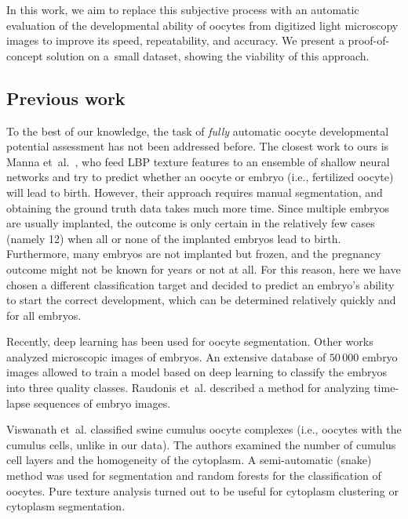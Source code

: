 \documentclass[]{spie}  %
\begin{document}
In this work, we aim to replace this subjective process with an automatic
evaluation of the developmental ability of oocytes from digitized light
microscopy images to improve its speed, repeatability, and accuracy. We present
a proof-of-concept solution on a~small dataset, showing the viability of this
approach.

\subsection{Previous work}

To the best of our knowledge, the task of \emph{fully} automatic oocyte developmental
potential assessment has not been addressed before. The closest work to ours is
Manna et~al.~\cite{manna2013}, who feed LBP texture features to an ensemble of
shallow neural networks and try to predict whether an oocyte or embryo (i.e.,
fertilized oocyte) will lead to birth. However, their approach requires manual segmentation, and obtaining the ground truth data takes much more time. Since multiple embryos
are usually implanted, the outcome is only certain in the relatively few cases (namely 12\cite{manna2013}) when all or none of the implanted embryos lead to birth. Furthermore, many
embryos are not implanted but frozen, and the pregnancy outcome might not be
known for years or not at all. For this reason, here we have chosen a different classification target and decided to predict an
embryo's ability to start the correct development, which can be determined
relatively quickly and for all embryos.

Recently, deep learning has been used for oocyte segmentation\cite{firuzinia2021,targosz2021}. Other works analyzed microscopic images of embryos\cite{khosravi2019, raudonis2019}. An extensive database of $50\,000$ embryo images allowed to train a model based on deep learning to classify the embryos into three
quality classes\cite{khosravi2019}. Raudonis et~al.\cite{raudonis2019} described a method for analyzing time-lapse sequences of embryo images.

Viswanath et~al.\cite{viswanath2016} classified swine cumulus oocyte complexes (i.e., oocytes with the cumulus cells, unlike in our data). The
authors examined the number of cumulus cell layers and the homogeneity of the cytoplasm. A semi-automatic (snake) method was used for segmentation and random forests for the classification of oocytes. Pure texture
analysis turned out to be useful for cytoplasm clustering{\cite{basile2010}}
or cytoplasm segmentation{\cite{caponetti2011}}.
\end{document}
